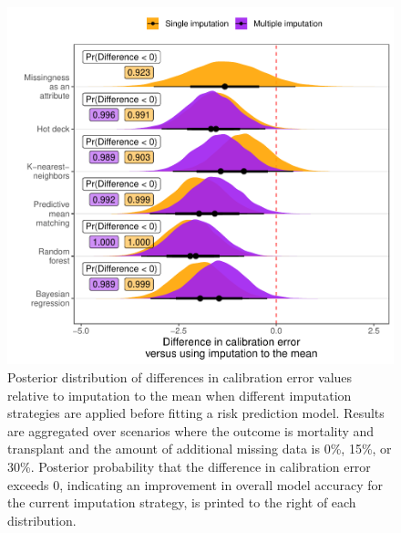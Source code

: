 \documentclass{article}
\begin{document}
\begin{figure}

{\centering \includegraphics{doc_arxiv_files/figure-latex/fig_md_strat_infer_cal_error-1} 

}

\caption{Posterior distribution of differences in calibration error values relative to imputation to the mean when different imputation strategies are applied before fitting a risk prediction model. Results are aggregated over scenarios where the outcome is mortality and transplant and the amount of additional missing data is 0\%, 15\%, or 30\%. Posterior probability that the difference in calibration error exceeds 0, indicating an improvement in overall model accuracy for the current imputation strategy, is printed to the right of each distribution.}\label{fig:fig_md_strat_infer_cal_error}
\end{figure}

\clearpage



\end{document}
